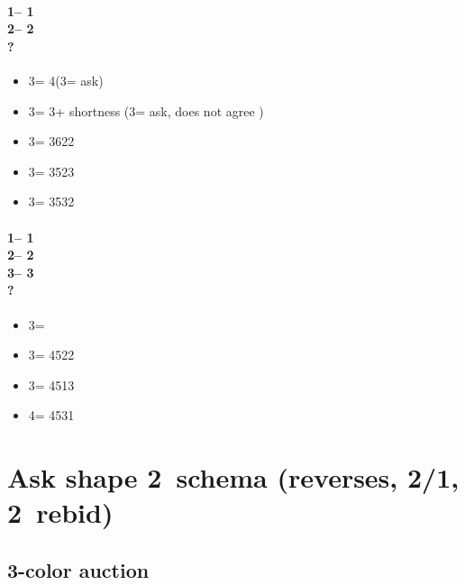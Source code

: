 \documentclass[12pt, a4paper]{report}
\begin{document}
{{        \subsubsection*{1\hearts -- 1\spades\\
                        2\spades -- 2\nt\\
                        ?}
        \begin{itemize}
            \item 3\clubs = 4\spades (3\diams = ask)
            \item 3\diams = 3\spades + shortness (3\hearts = ask, does not agree \spades)
            \item 3\hearts = 3622
            \item 3\spades = 3523
            \item 3\nt = 3532
        \end{itemize}

        \subsubsection*{1\hearts -- 1\spades\\
                        2\spades -- 2\nt\\
                        3\clubs -- 3\diams\\
                        ?}
        \begin{itemize}
            \item 3\hearts = \bal
            \item 3\spades = 4522
            \item 3\nt = 4513
            \item 4\clubs = 4531
        \end{itemize}
    }

    \chapter*{\colorbox{Plum!30}{Ask shape 2\ntch\ schema}
            \colorbox{Plum!30}{(reverses, 2/1, 2\ntch\ rebid)}}
     {
        
        \section*{\colorbox{blue!30}{3-color auction}}
         {

}}}
\end{document}
